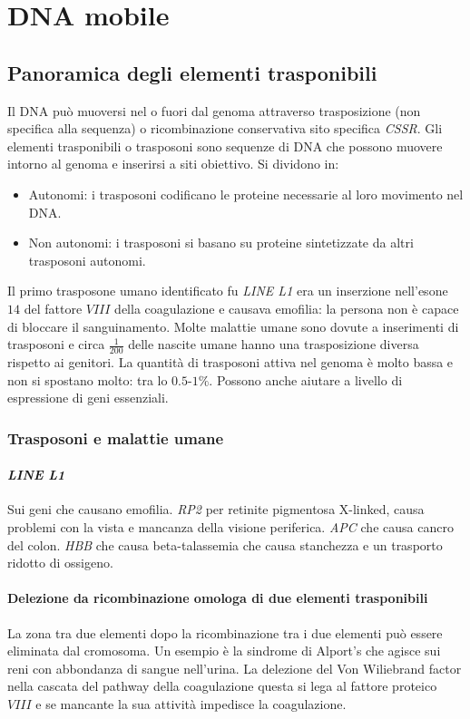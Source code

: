 \chapter{DNA mobile}

\section{Panoramica degli elementi trasponibili}
Il DNA pu\`o muoversi nel o fuori dal genoma attraverso trasposizione (non specifica alla sequenza) o ricombinazione conservativa sito specifica \emph{CSSR}.
Gli elementi trasponibili o trasposoni sono sequenze di DNA che possono muovere intorno al genoma e inserirsi a siti obiettivo.
Si dividono in:
\begin{itemize}
	\item Autonomi: i trasposoni codificano le proteine necessarie al loro movimento nel DNA.
	\item Non autonomi: i trasposoni si basano su proteine sintetizzate da altri trasposoni autonomi.
\end{itemize}
Il primo trasposone umano identificato fu \emph{LINE L1} era un inserzione nell'esone $14$ del fattore $VIII$ della coagulazione e causava emofilia: la persona non \`e capace di bloccare il sanguinamento.
Molte malattie umane sono dovute a inserimenti di trasposoni e circa $\frac{1}{200}$ delle nascite umane hanno una trasposizione diversa rispetto ai genitori. 
La quantit\`a di trasposoni attiva nel genoma \`e molto bassa e non si spostano molto: tra lo $0.5$-$1\%$.
Possono anche aiutare a livello di espressione di geni essenziali.

	\subsection{Trasposoni e malattie umane}

		\subsubsection{\emph{LINE L1}}
		Sui geni che causano emofilia.
		\emph{RP2} per retinite pigmentosa X-linked, causa problemi con la vista e mancanza della visione periferica.
		\emph{APC} che causa cancro del colon.
		\emph{HBB} che causa beta-talassemia che causa stanchezza e un trasporto ridotto di ossigeno.

		\subsubsection{Delezione da ricombinazione omologa di due elementi trasponibili}
		La zona tra due elementi dopo la ricombinazione tra i due elementi pu\`o essere eliminata dal cromosoma.
		Un esempio \`e la sindrome di Alport's che agisce sui reni con abbondanza di sangue nell'urina.
		La delezione del Von Wiliebrand factor nella cascata del pathway della coagulazione questa si lega al fattore proteico $VIII$ e se mancante la sua attivit\`a impedisce la coagulazione.

